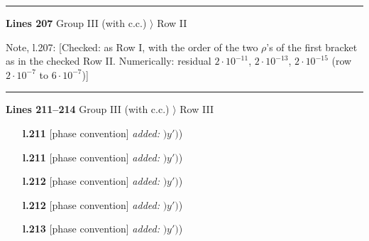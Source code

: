 \documentclass[10pt]{article}
\newenvironment{notebox}{\def\FrameCommand{{\color{notebar}\vrule width 1.5pt}\hspace{6pt}}\MakeFramed{\advance\hsize-\width\FrameRestore}\small}{\endMakeFramed}
\begin{document}
\noindent\rule{\linewidth}{0.3pt}\par\noindent\textbf{Lines 207} \quad \textsf{Group III (with c.c.) $\rangle$ Row II}\par
\begin{notebox}\textsf{\small Note, l.207:} [Checked: as Row I, with the order of the two $\rho$'s of the first bracket as in the checked Row II. Numerically: residual $2\cdot10^{-11}$, $2\cdot10^{-13}$, $2\cdot10^{-15}$ (row $2\cdot10^{-7}$ to $6\cdot10^{-7}$)]\end{notebox}
\noindent\rule{\linewidth}{0.3pt}\par\noindent\textbf{Lines 211--214} \quad \textsf{Group III (with c.c.) $\rangle$ Row III} \par
\begin{itemize}[leftmargin=2.2em,itemsep=1pt,topsep=2pt]
\item[\textbf{l.211}] \textsf{\small [phase convention]} \emph{added:} $\displaystyle )$$\displaystyle y')${\color{gray}\small)}
\item[\textbf{l.211}] \textsf{\small [phase convention]} \emph{added:} $\displaystyle )$$\displaystyle y')${\color{gray}\small)}
\item[\textbf{l.212}] \textsf{\small [phase convention]} \emph{added:} $\displaystyle )$$\displaystyle y')${\color{gray}\small)}
\item[\textbf{l.212}] \textsf{\small [phase convention]} \emph{added:} $\displaystyle )$$\displaystyle y')${\color{gray}\small)}
\item[\textbf{l.213}] \textsf{\small [phase convention]} \emph{added:} $\displaystyle )$$\displaystyle y')${\color{gray}\small)}
\end{itemize}
\end{document}

